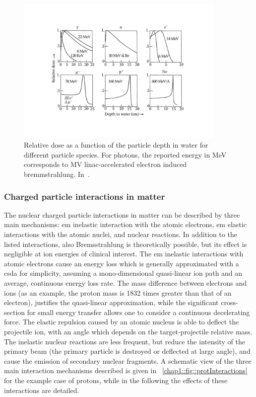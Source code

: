 \begin{figure}[!htbp]
\centering
\includegraphics[width=0.9\textwidth , trim={0.5cm 1.5cm 0.5cm 1.5cm}, clip=true]{03_GraphicFiles/chapter1_Introduction/depth_doseProf_multipleIMG.pdf}
\caption{Relative dose as a function of the particle depth in water for different particle species. For photons, the reported energy in MeV corresponds to MV linac-accelerated electron induced bremmstrahlung. In~\cite{PaganettiBook2012}.}
\label{chap1::fig::Depth-doseProf}
\end{figure} 

\subsubsection{Charged particle interactions in matter}\label{chap1::subsubsec::ionInteractions}

The nuclear charged particle interactions in matter can be described by three main mechanisms: \gls{em} inelastic interaction with the atomic electrons, \gls{em} elastic interactions with the atomic nuclei, and nuclear reactions. In addition to the listed interactions, also Bremsstrahlung is theoretically possible, but its effect is negligible at ion energies of clinical interest. 
The \gls{em} inelastic interactions with atomic electrons cause an energy loss which is generally approximated with a \gls{csda} for simplicity, assuming a mono-dimensional quasi-linear ion path and an average, continuous energy loss rate. The mass difference between electrons and ions (as an example, the proton mass is 1832 times greater than that of an electron), justifies the quasi-linear approximation, while the significant cross-section for small energy transfer allows one to consider a continuous decelerating force. The elastic repulsion caused by an atomic nucleus is able to deflect the projectile ion, with an angle which depends on the target-projectile relative mass. The inelastic nuclear reactions are less frequent, but reduce the intensity of the primary beam (the primary particle is destroyed or deflected at large angle), and cause the emission of secondary nuclear fragments. A schematic view of the three main interaction mechanisms described is given in \figurename~\ref{chap1::fig::protInteractions} for the example case of protons, while in the following the effects of these interactions are detailed.   

